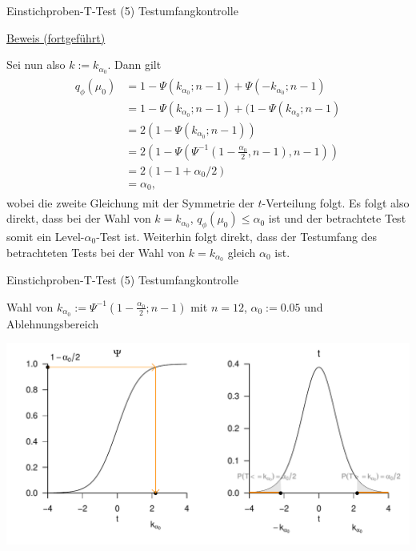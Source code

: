 \documentclass[
  8pt,
  ignorenonframetext,
]{beamer}
\begin{document}
\begin{frame}{Einstichproben-T-Test \textbar{} (5) Testumfangkontrolle}
\protect\hypertarget{einstichproben-t-test-5-testumfangkontrolle-1}{}
\footnotesize

\underline{Beweis (fortgeführt)}

Sei nun also \(k := k_{\alpha_0}\). Dann gilt \begin{align}
\begin{split}
q_\phi(\mu_0)
& = 1 - \Psi(k_{\alpha_0};n-1) + \Psi(-k_{\alpha_0};n-1)                             \\
& = 1 - \Psi(k_{\alpha_0};n-1) + (1 - \Psi(k_{\alpha_0};n-1)                         \\
& = 2(1-\Psi(k_{\alpha_0};n-1))                                                      \\
& = 2\left(1-\Psi\left(\Psi^{-1}\left(1- \frac{\alpha_0}{2} , n-1\right), n-1\right)\right) \\
& = 2\left(1 - 1 + \alpha_0/2\right)                          \\
& = \alpha_0,
\end{split}
\end{align} wobei die zweite Gleichung mit der Symmetrie der
\(t\)-Verteilung folgt. Es folgt also direkt, dass bei der Wahl von
\(k = k_{\alpha_0}\), \(q_\phi(\mu_0)\le \alpha_0\) ist und der
betrachtete Test somit ein Level-\(\alpha_0\)-Test ist. Weiterhin folgt
direkt, dass der Testumfang des betrachteten Tests bei der Wahl von
\(k = k_{\alpha_0}\) gleich \(\alpha_0\) ist.
\end{frame}

\begin{frame}{Einstichproben-T-Test \textbar{} (5) Testumfangkontrolle}
\protect\hypertarget{einstichproben-t-test-5-testumfangkontrolle-2}{}
\small

\center Wahl von
\(k_{\alpha_0} := \Psi^{-1}(1- \frac{\alpha_0}{2}; n-1)\) mit \(n =12\),
\(\alpha_0 := 0.05\) und Ablehnungsbereich \vspace{3mm}

\begin{center}\includegraphics[width=1\linewidth]{12_Abbildungen/wtfi_12_t_test_ungerichtet_testumfangkontrolle} \end{center}
\end{frame}
\end{document}
